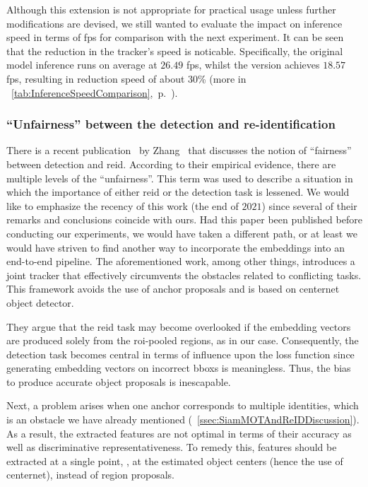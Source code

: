 Although this extension is not appropriate for practical usage unless further modifications are devised, we still wanted to evaluate the impact on inference speed in terms of \gls{fps} for comparison with the next experiment. It can be seen that the reduction in the tracker's speed is noticable. Specifically, the original model inference runs on average at $26.49$ \gls{fps}, whilst the \fembmodel{} version achieves $18.57$ \gls{fps}, resulting in reduction speed of about $30$\% (more in \tabletext{}~\ref{tab:InferenceSpeedComparison},~p.~\pageref{tab:InferenceSpeedComparison}).

\subsubsection{``Unfairness'' between the detection and re-identification}

There is a recent publication~\cite{zhang2021fairmot} by Zhang~\etal{} that discusses the notion of ``fairness'' between detection and \gls{reid}. According to their empirical evidence, there are multiple levels of the ``unfairness''. This term was used to describe a situation in which the importance of either \gls{reid} or the detection task is lessened. We would like to emphasize the recency of this work (the end of $2021$) since several of their remarks and conclusions coincide with ours. Had this paper been published before conducting our experiments, we would have taken a different path, or at least we would have striven to find another way to incorporate the embeddings into an end-to-end pipeline. The aforementioned work, among other things, introduces a joint tracker that effectively circumvents the obstacles related to conflicting tasks. This framework avoids the use of anchor proposals and is based on \gls{centernet}~\cite{zhou2019centernet} object detector.

They argue that the \gls{reid} task may become overlooked if the embedding vectors are produced solely from the \gls{roi}-pooled regions, as in our case. Consequently, the detection task becomes central in terms of influence upon the loss function since generating embedding vectors on incorrect \glspl{bbox} is meaningless. Thus, the bias to produce accurate object proposals is inescapable.

Next, a problem arises when one anchor corresponds to multiple identities, which is an obstacle we have already mentioned (\sectiontext{}~\ref{ssec:SiamMOTAndReIDDiscussion}). As a result, the extracted features are not optimal in terms of their accuracy as well as discriminative representativeness. To remedy this, features should be extracted at a single point, \ietext{}, at the estimated object centers (hence the use of \gls{centernet}), instead of region proposals.

